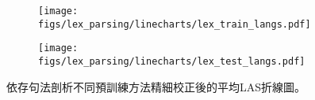 \begin{figure}[htbp]
    \centering
    \begin{subfigure}[t]{\textwidth}
        \centering
        \texttt{[image: figs/lex\_parsing/linecharts/lex\_train\_langs.pdf]}
    \end{subfigure}
    \vspace{-12pt}
    \begin{subfigure}[t]{\textwidth}
        \centering
        \texttt{[image: figs/lex\_parsing/linecharts/lex\_test\_langs.pdf]}
    \end{subfigure}
    \caption{依存句法剖析不同預訓練方法精細校正後的平均LAS折線圖。}
    \label{fig:lex_avg}
\end{figure}
